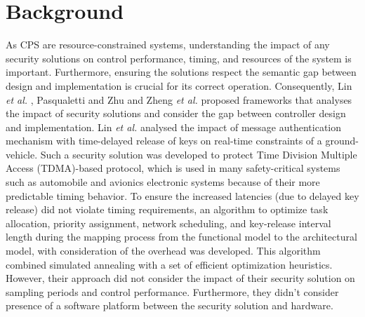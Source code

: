 \section{Background}

As CPS are resource-constrained systems, understanding the impact of any security solutions on  control performance, timing, and resources of the system is important. Furthermore, ensuring the solutions respect the semantic gap between design and implementation is crucial for its correct operation. Consequently, Lin \textit{et al.} \cite{LZV14}, Pasqualetti and Zhu \cite{PZ15} and Zheng \textit{et al.} \cite{ZDRP16} proposed frameworks that analyses the impact of security solutions and consider the gap between controller design and implementation. Lin \textit{et al.} \cite{LZV14} analysed the impact of message authentication mechanism with time-delayed release of keys on real-time constraints of a ground-vehicle. Such a security solution was developed to protect Time Division Multiple Access (TDMA)-based protocol, which is used in many safety-critical systems such as automobile and avionics electronic systems because of their more predictable timing behavior. To ensure the increased latencies (due to delayed key release) did not violate timing requirements, an algorithm to optimize task allocation, priority assignment, network scheduling, and key-release interval length during the mapping process from the functional model to the architectural model, with consideration of the overhead was developed. This algorithm combined simulated annealing with a set of efficient optimization heuristics. However, their approach did not consider the impact of their security solution on sampling periods and control performance. Furthermore, they didn't consider presence of a software platform between the security solution and hardware.     


